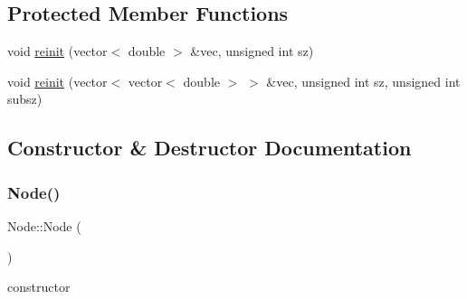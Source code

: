 \subsection*{Protected Member Functions}
\begin{DoxyCompactItemize}
\item 
void \mbox{\hyperlink{class_node_a0a8fab0b8f38b3f8a85985da392ce1e1}{reinit}} (vector$<$ double $>$ \&vec, unsigned int sz)
\item 
void \mbox{\hyperlink{class_node_a2e2c14330fcafc1be40ea5740789bdef}{reinit}} (vector$<$ vector$<$ double $>$ $>$ \&vec, unsigned int sz, unsigned int subsz)
\end{DoxyCompactItemize}


\subsection{Constructor \& Destructor Documentation}
\mbox{\label{class_node_ad7a34779cad45d997bfd6d3d8043c75f}} 
\subsubsection{\texorpdfstring{Node()}{Node()}\hspace{0.1cm}{\footnotesize\ttfamily [1/2]}}
{\footnotesize\ttfamily Node\+::\+Node (\begin{DoxyParamCaption}{ }\end{DoxyParamCaption})}

constructor \mbox{\label{class_node_a2f4945a1768bf4b7470d5e63028265b2}} 
